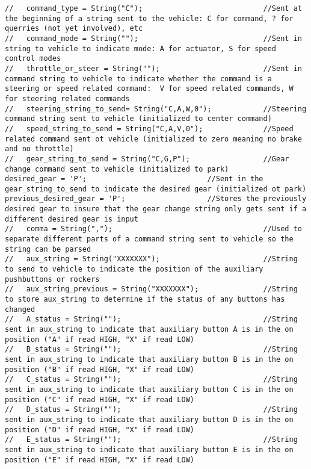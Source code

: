 \begin{lstlisting}[breaklines=true,basicstyle=\tiny]
//   command_type = String("C");                            //Sent at the beginning of a string sent to the vehicle: C for command, ? for querries (not yet involved), etc
//   command_mode = String("");                             //Sent in string to vehicle to indicate mode: A for actuator, S for speed control modes
//   throttle_or_steer = String("");                        //Sent in command string to vehicle to indicate whether the command is a steering or speed related command:  V for speed related commands, W for steering related commands
//   steering_string_to_send= String("C,A,W,0");            //Steering command string sent to vehicle (initialized to center command)
//   speed_string_to_send = String("C,A,V,0");              //Speed related command sent ot vehicle (initialized to zero meaning no brake and no throttle)
//   gear_string_to_send = String("C,G,P");                 //Gear change command sent to vehicle (initialized to park)
desired_gear = 'P';                            //Sent in the gear_string_to_send to indicate the desired gear (initialized ot park)
previous_desired_gear = 'P';                   //Stores the previously desired gear to insure that the gear change string only gets sent if a different desired gear is input
//   comma = String(",");                                   //Used to separate different parts of a command string sent to vehicle so the string can be parsed
//   aux_string = String("XXXXXXX");                        //String to send to vehicle to indicate the position of the auxiliary pushbuttons or rockers
//   aux_string_previous = String("XXXXXXX");               //String to store aux_string to determine if the status of any buttons has changed
//   A_status = String("");                                 //String sent in aux_string to indicate that auxiliary button A is in the on position ("A" if read HIGH, "X" if read LOW)
//   B_status = String("");                                 //String sent in aux_string to indicate that auxiliary button B is in the on position ("B" if read HIGH, "X" if read LOW)
//   C_status = String("");                                 //String sent in aux_string to indicate that auxiliary button C is in the on position ("C" if read HIGH, "X" if read LOW)
//   D_status = String("");                                 //String sent in aux_string to indicate that auxiliary button D is in the on position ("D" if read HIGH, "X" if read LOW)
//   E_status = String("");                                 //String sent in aux_string to indicate that auxiliary button E is in the on position ("E" if read HIGH, "X" if read LOW)

\end{lstlisting}
